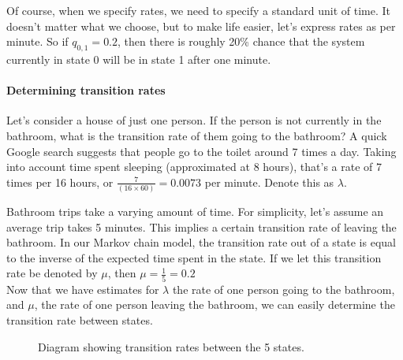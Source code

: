 Of course, when we specify rates, we need to specify a standard unit of time. It doesn't matter what we choose, but to make life easier, let's express rates as per minute. So if $q_{0, 1} = 0.2$, then there is roughly 20\% chance that the system currently in state 0 will be in state 1 after one minute.

\paragraph{Determining transition rates}
Let's consider a house of just one person. If the person is not currently in the bathroom, what is the transition rate of them going to the bathroom? A quick Google search suggests that people go to the toilet around 7 times a day. Taking into account time spent sleeping (approximated at 8 hours), that's a rate of 7 times per 16 hours, or $\frac{7}{(16 \times 60)} = 0.0073$ per minute. Denote this as $\lambda$.

Bathroom trips take a varying amount of time. For simplicity, let's assume an average trip takes 5 minutes. This implies a certain transition rate of leaving the bathroom. In our Markov chain model, the transition rate out of a state is equal to the inverse of the expected time spent in the state. If we let this transition rate be denoted by $\mu$, then $\mu = \frac{1}{5} = 0.2 $
\\

Now that we have estimates for $\lambda$ the rate of one person going to the bathroom, and $\mu$, the rate of one person leaving the bathroom, we can easily determine the transition rate between states. 

\begin{figure}[H]
	\centering
	\caption{Diagram showing transition rates between the 5 states.}
	\label{fig: bathroom visual}
\end{figure}

